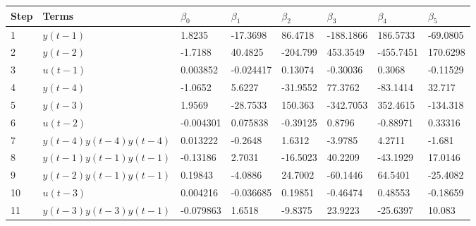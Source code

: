 \begin{tabular}{llllllll}
Step & Terms & $\beta_{0}$ & $\beta_{1}$ & $\beta_{2}$ & $\beta_{3}$ & $\beta_{4}$ & $\beta_{5}$ \\ 
\hline 
1 & $y(t-1)$ & 1.8235 & -17.3698 & 86.4718 & -188.1866 & 186.5733 & -69.0805 \\ 
2 & $y(t-2)$ & -1.7188 & 40.4825 & -204.799 & 453.3549 & -455.7451 & 170.6298 \\ 
3 & $u(t-1)$ & 0.003852 & -0.024417 & 0.13074 & -0.30036 & 0.3068 & -0.11529 \\ 
4 & $y(t-4)$ & -1.0652 & 5.6227 & -31.9552 & 77.3762 & -83.1414 & 32.717 \\ 
5 & $y(t-3)$ & 1.9569 & -28.7533 & 150.363 & -342.7053 & 352.4615 & -134.318 \\ 
6 & $u(t-2)$ & -0.004301 & 0.075838 & -0.39125 & 0.8796 & -0.88971 & 0.33316 \\ 
7 & $y(t-4)y(t-4)y(t-4)$ & 0.013222 & -0.2648 & 1.6312 & -3.9785 & 4.2711 & -1.681 \\ 
8 & $y(t-1)y(t-1)y(t-1)$ & -0.13186 & 2.7031 & -16.5023 & 40.2209 & -43.1929 & 17.0146 \\ 
9 & $y(t-2)y(t-1)y(t-1)$ & 0.19843 & -4.0886 & 24.7002 & -60.1446 & 64.5401 & -25.4082 \\ 
10 & $u(t-3)$ & 0.004216 & -0.036685 & 0.19851 & -0.46474 & 0.48553 & -0.18659 \\ 
11 & $y(t-3)y(t-3)y(t-1)$ & -0.079863 & 1.6518 & -9.8375 & 23.9223 & -25.6397 & 10.083 \\ 
\hline 
\end{tabular}